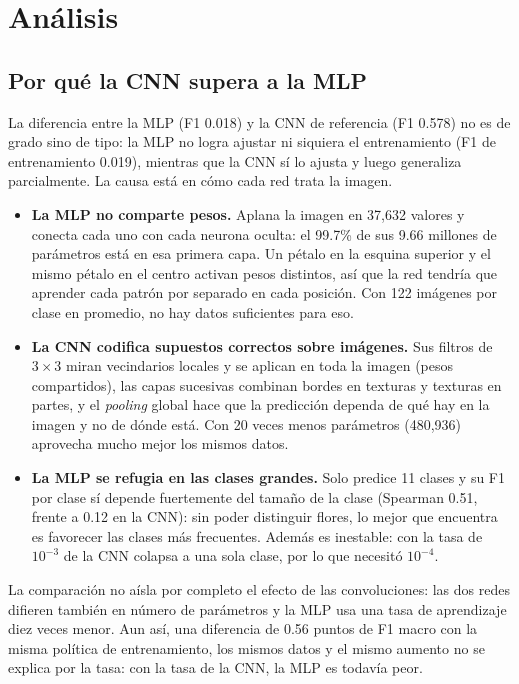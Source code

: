 \section{Análisis}
\label{sec:analisis}

\subsection{Por qué la CNN supera a la MLP}

La diferencia entre la MLP (F1 0.018) y la CNN de referencia (F1 0.578) no es de
grado sino de tipo: la MLP no logra ajustar ni siquiera el entrenamiento
(F1 de entrenamiento 0.019), mientras que la CNN sí lo ajusta y luego
generaliza parcialmente. La causa está en cómo cada red trata la imagen.

\begin{itemize}
\item \textbf{La MLP no comparte pesos.} Aplana la imagen en 37,632 valores y
conecta cada uno con cada neurona oculta: el 99.7\% de sus 9.66 millones de
parámetros está en esa primera capa. Un pétalo en la esquina superior y el mismo
pétalo en el centro activan pesos distintos, así que la red tendría que aprender
cada patrón por separado en cada posición. Con 122 imágenes por clase en
promedio, no hay datos suficientes para eso.
\item \textbf{La CNN codifica supuestos correctos sobre imágenes.} Sus filtros
de $3\times3$ miran vecindarios locales y se aplican en toda la imagen (pesos
compartidos), las capas sucesivas combinan bordes en texturas y texturas en
partes, y el \emph{pooling} global hace que la predicción dependa de qué hay en
la imagen y no de dónde está. Con 20 veces menos parámetros (480,936) aprovecha
mucho mejor los mismos datos.
\item \textbf{La MLP se refugia en las clases grandes.} Solo predice 11 clases y
su F1 por clase sí depende fuertemente del tamaño de la clase (Spearman 0.51,
frente a 0.12 en la CNN): sin poder distinguir flores, lo mejor que encuentra es
favorecer las clases más frecuentes. Además es inestable: con la tasa de
$10^{-3}$ de la CNN colapsa a una sola clase, por lo que necesitó $10^{-4}$.
\end{itemize}

La comparación no aísla por completo el efecto de las convoluciones: las dos redes
difieren también en número de parámetros y la MLP usa una tasa de aprendizaje
diez veces menor. Aun así, una diferencia de 0.56 puntos de F1 macro con la
misma política de entrenamiento, los mismos datos y el mismo aumento no se
explica por la tasa: con la tasa de la CNN, la MLP es todavía peor.

